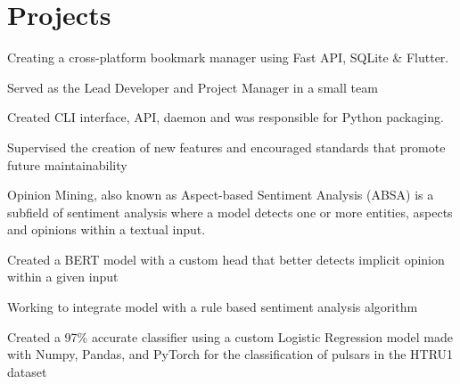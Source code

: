 \documentclass[]{resume-template}
\begin{document}
\hfill
\begin{minipage}[t]{0.66\textwidth}


	\section{Projects}\label{sec:projects}

	\label{subsec: Bookie}
	\vspace{\topsep}
	\begin{tightemize}
		\item Creating a cross-platform bookmark manager using Fast API, SQLite \& Flutter.
		\item Served as the Lead Developer and Project Manager in a small team
		\item Created CLI interface, API, daemon and was responsible for Python packaging.
		\item Supervised the creation of new features and encouraged standards that promote future maintainability
	\end{tightemize}
	\vspace{\topsep}

	\label{subsec:opinionmining}
	\begin{tightemize}
		\item Opinion Mining, also known as Aspect-based Sentiment Analysis (ABSA) is a subfield of sentiment analysis
		where a model detects one or more entities, aspects and opinions within a textual input.
		\item Created a BERT model with a custom head that better detects implicit opinion within a given input
		\item Working to integrate model with a rule based sentiment analysis algorithm
	\end{tightemize}
	\vspace{\topsep}

	\label{subsec:pulsar-identification}
	\begin{tightemize}
		\item Created a 97\% accurate classifier using a custom Logistic Regression model made with Numpy, Pandas, and PyTorch for the classification of pulsars in the HTRU1 dataset
	\end{tightemize}


\end{minipage}
\end{document}
